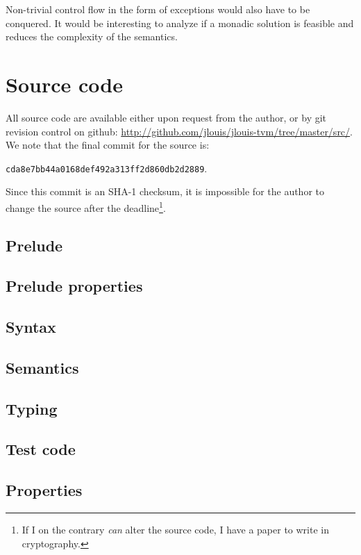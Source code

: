 \documentclass[a4paper, oneside, 10pt, draft]{memoir}
\begin{document}
Non-trivial control flow in the form of exceptions would also have to
be conquered. It would be interesting to analyze if a monadic solution
is feasible and reduces the complexity of the semantics.



\appendix
\chapter{Source code}
All source code are available either upon request from the author, or
by git revision control on github:
\url{http://github.com/jlouis/jlouis-tvm/tree/master/src/}. We note
that the final commit for the source is:
\begin{center}
  \texttt{cda8e7bb44a0168def492a313ff2d860db2d2889}.
\end{center}
Since this commit is an SHA-1 checksum, it is impossible for the
author to change the source after the deadline\footnote{If I on the
  contrary \emph{can} alter the source code, I have a paper to write
  in cryptography.}.

\section{Prelude}
{\footnotesize

}
\section{Prelude properties}
{\footnotesize

}
\section{Syntax}
{\footnotesize

}
\section{Semantics}
{\footnotesize

}
\section{Typing}
{\footnotesize

}
\section{Test code}
{\footnotesize

}
\section{Properties}
{\footnotesize

}
\end{document}
